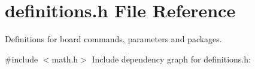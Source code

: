 \section{definitions.\+h File Reference}
\label{definitions_8h}


Definitions for board commands, parameters and packages.  


{\ttfamily \#include $<$math.\+h$>$}\newline
Include dependency graph for definitions.\+h\+:
